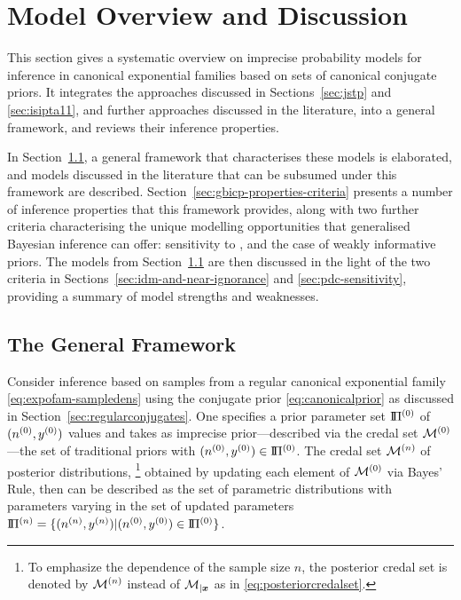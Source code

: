 \section{Model Overview and Discussion}
\label{sec:generalmodel}

This section gives a systematic overview on imprecise probability models
for inference in canonical exponential families
based on sets of canonical conjugate priors.
It integrates the approaches discussed in Sections~\ref{sec:jstp} and \ref{sec:isipta11},
and further approaches discussed in the literature, into a general framework,
and reviews their inference properties.

\medskip

In Section~\ref{sec:basicsetting}, a general framework that characterises these models is elaborated,
and models discussed in the literature that can be subsumed under this framework are described. %
%
Section~\ref{sec:gbicp-properties-criteria} presents a number of inference properties that this framework provides,
along with two further criteria characterising the unique modelling opportunities that
generalised Bayesian inference can offer: sensitivity to \pdc, and the case of weakly informative priors.
%
The models from Section~\ref{sec:basicsetting} are then discussed in the light of the two criteria in
Sections~\ref{sec:idm-and-near-ignorance} and \ref{sec:pdc-sensitivity},
providing a summary of model strengths and weaknesses.


\subsection{The General Framework}
\label{sec:basicsetting}

Consider inference based on samples from a regular canonical exponential family \eqref{eq:expofam-sampledens}
using the conjugate prior \eqref{eq:canonicalprior} as discussed in Section~\ref{sec:regularconjugates}.
One specifies a prior parameter set $\text{I}\!\Pi^{(0)}$ of $(n^{(0)},y^{(0)})$ values
and takes as imprecise prior---described via the credal set $\mathcal{M}^{(0)}$---the set of traditional priors with $(n^{(0)}, y^{(0)}) \in \text{I}\!\Pi^{(0)}$.
The credal set $\mathcal{M}^{(n)}$ of posterior distributions,%
\footnote{To emphasize the dependence of the sample size $n$,
the posterior credal set is denoted by $\mathcal{M}^{(n)}$ instead of $\mathcal{M}_{\vert {\bm x}}$ as in \eqref{eq:posteriorcredalset}.}
obtained by updating each element of $\mathcal{M}^{(0)}$ via Bayes' Rule,
then can be described as the set of parametric distributions
with parameters varying in the set of updated parameters $\text{I}\!\Pi^{(n)} = \{(n^{(n)},y^{(n)}) \vert (n^{(0)}, y^{(0)}) \in \text{I}\!\Pi^{(0)}\}$.

